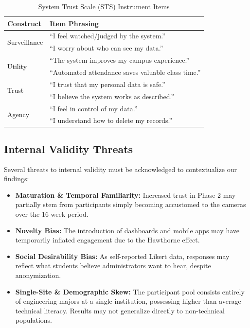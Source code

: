 \documentclass[conference]{IEEEtran}
\begin{document}
\begin{table}[htbp]
\caption{System Trust Scale (STS) Instrument Items}
\begin{center}
\begin{tabular}{lp{6cm}}
\toprule
\textbf{Construct} & \textbf{Item Phrasing} \\
\midrule
\multirow{2}{*}{Surveillance} & ``I feel watched/judged by the system.'' \\
& ``I worry about who can see my data.'' \\
\midrule
\multirow{2}{*}{Utility} & ``The system improves my campus experience.'' \\
& ``Automated attendance saves valuable class time.'' \\
\midrule
\multirow{2}{*}{Trust} & ``I trust that my personal data is safe.'' \\
& ``I believe the system works as described.'' \\
\midrule
\multirow{2}{*}{Agency} & ``I feel in control of my data.'' \\
& ``I understand how to delete my records.'' \\
\bottomrule
\end{tabular}
\end{center}
\label{tab:survey}
\end{table}

\subsection{Internal Validity Threats}
Several threats to internal validity must be acknowledged to contextualize our findings:
\begin{itemize}
    \item \textbf{Maturation \& Temporal Familiarity:} Increased trust in Phase 2 may partially stem from participants simply becoming accustomed to the cameras over the 16-week period.
    \item \textbf{Novelty Bias:} The introduction of dashboards and mobile apps may have temporarily inflated engagement due to the Hawthorne effect.
    \item \textbf{Social Desirability Bias:} As self-reported Likert data, responses may reflect what students believe administrators want to hear, despite anonymization.
    \item \textbf{Single-Site \& Demographic Skew:} The participant pool consists entirely of engineering majors at a single institution, possessing higher-than-average technical literacy. Results may not generalize directly to non-technical populations.
\end{itemize}
\end{document}
